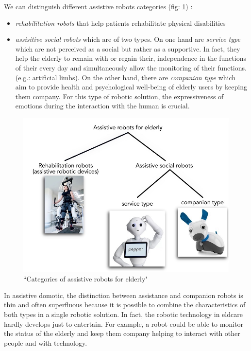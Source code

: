 \documentclass{thesisreport}
\begin{document}
 We can distinguish different assistive robots categories (fig: \ref{fig:typeRobot}) \cite{assistiveRobots}:
 \begin{itemize}
     \item \textit{rehabilitation robots} that help patients rehabilitate physical disabilities
     \item \textit{assisitive social robots} which are of two types. On one hand are \emph{service type} which are not perceived as a social but rather as a supportive. In fact, they help the elderly to remain with or regain their, independence in the functions of their every day and simultaneously allow the monitoring of their functions. (e.g.: artificial limbs). On the other hand, there are \emph{companion type} which aim to provide health and psychological well-being of elderly users by keeping them company. For this type of robotic solution, the expressiveness of emotions during the interaction with the human is crucial.
 \end{itemize}
 
 \begin{figure}[ht]
	\centering
	\includegraphics[width=14cm]{Thesis/data/TypeRobot.jpg}
	\caption{``Categories of assistive robots for elderly" \cite{assistiveRobots}}
	\label{fig:typeRobot}
 \end{figure}
 
 In assistive domotic, the distinction between assistance and companion robots is thin and often superfluous because it is possible to combine the characteristics of both types in a single robotic solution. In fact, the robotic technology in eldcare hardly develops just to entertain.
 For example, a robot could be able to monitor the status of the elderly and keep them company helping to interact with other people and with technology.
 
\end{document}
